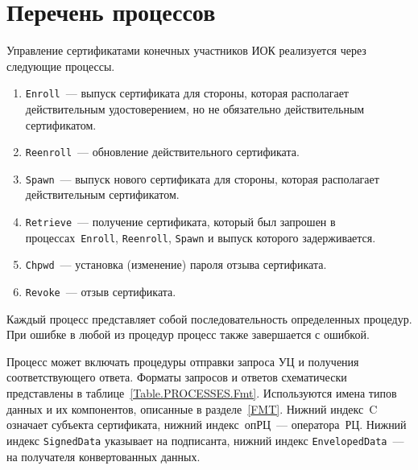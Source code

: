 \section{Перечень процессов}\label{PROCESSES.List}

Управление сертификатами конечных участников ИОК реализуется через 
следующие процессы. 

\begin{enumerate}
\item
\texttt{Enroll}~--- 
выпуск сертификата для стороны, которая располагает действительным
удостоверением, но не обязательно действительным сертификатом.
\item
\texttt{Reenroll}~--- 
обновление действительного сертификата.
\item
\texttt{Spawn}~--- 
выпуск нового сертификата для стороны, которая располагает действительным
сертификатом.
\item
\texttt{Retrieve}~--- 
получение сертификата, который был запрошен в процессах~\texttt{Enroll},
\texttt{Reenroll}, \texttt{Spawn} и выпуск которого задерживается.
\item
\texttt{Chpwd}~--- 
установка (изменение) пароля отзыва сертификата.
\item
\texttt{Revoke}~--- 
отзыв сертификата.
\end{enumerate}

Каждый процесс представляет собой последовательность определенных процедур. 
При ошибке в любой из процедур процесс также завершается с ошибкой.

Процесс может включать процедуры отправки запроса УЦ и получения 
соответствующего ответа. Форматы запросов и ответов схематически представлены 
в таблице~\ref{Table.PROCESSES.Fmt}. Используются имена типов данных и их 
компонентов, описанные в разделе~\ref{FMT}. Нижний индекс~C означает 
субъекта сертификата, нижний индекс~опРЦ~--- оператора~РЦ.
Нижний индекс \texttt{SignedData} указывает на подписанта,
нижний индекс \texttt{EnvelopedData}~--- на получателя конвертованных 
данных.

